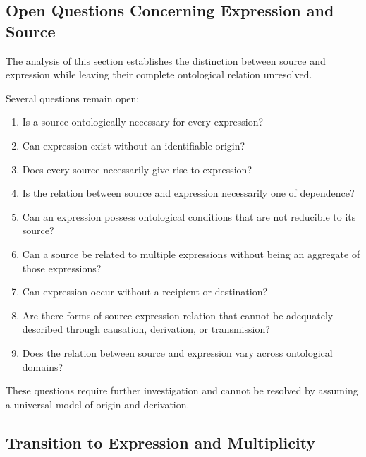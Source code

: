 \subsection{Open Questions Concerning Expression and Source}

The analysis of this section establishes
the distinction between source and expression
while leaving their complete ontological
relation unresolved.

Several questions remain open:

\begin{enumerate}
    \item Is a source ontologically necessary
    for every expression?

    \item Can expression exist without an
    identifiable origin?

    \item Does every source necessarily give
    rise to expression?

    \item Is the relation between source and
    expression necessarily one of dependence?

    \item Can an expression possess ontological
    conditions that are not reducible to its source?

    \item Can a source be related to multiple
    expressions without being an aggregate
    of those expressions?

    \item Can expression occur without a recipient
    or destination?

    \item Are there forms of source-expression
    relation that cannot be adequately described
    through causation, derivation, or transmission?

    \item Does the relation between source and
    expression vary across ontological domains?
\end{enumerate}

These questions require further investigation
and cannot be resolved by assuming a universal
model of origin and derivation.

\subsection{Transition to Expression and Multiplicity}


